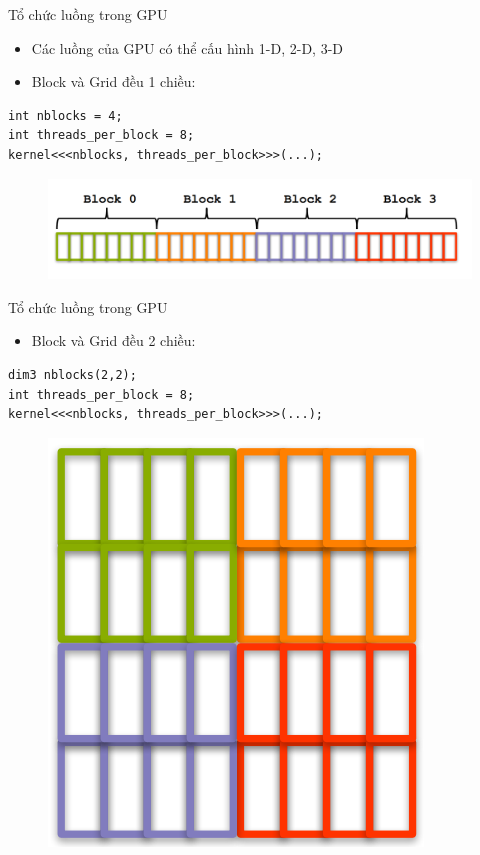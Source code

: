 \documentclass[10pt]{beamer}
\theoremstyle{remark}
\numberwithin{algocf}{section}
\numberwithin{equation}{section}
\numberwithin{dl}{section}
\numberwithin{figure}{section}
\begin{document}
\begin{frame}[fragile]{Tổ chức luồng trong GPU}
    \begin{itemize}
        \item Các luồng của GPU có thể cấu hình 1-D, 2-D, 3-D
        \item Block và Grid đều 1 chiều:
    \end{itemize}
    \begin{verbatim}
int nblocks = 4;
int threads_per_block = 8;
kernel<<<nblocks, threads_per_block>>>(...);
    \end{verbatim}

    \begin{figure}[H]
        \centering
        \includegraphics[width=0.7\linewidth]{figures/CUDA/1d_Grid_Block.png}
    \end{figure}
\end{frame}

\begin{frame}[fragile]{Tổ chức luồng trong GPU}
    \begin{itemize}
        \item Block và Grid đều 2 chiều:
    \end{itemize}
    \begin{verbatim}
dim3 nblocks(2,2);
int threads_per_block = 8;
kernel<<<nblocks, threads_per_block>>>(...);
    \end{verbatim}

    \begin{figure}[H]
        \centering
        \includegraphics[height=0.5\textheight]{figures/CUDA/2d_Grid_Block.png}
    \end{figure}
\end{frame}
\end{document}
